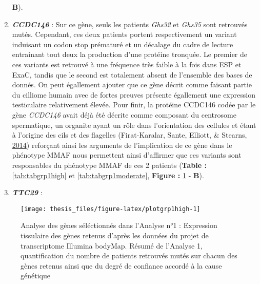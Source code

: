 \documentclass[12pt,twoside]{reedthesis}
\theoremstyle{definition}
\theoremstyle{definition}
\theoremstyle{remark}
\begin{document}
\begin{enumerate}
    \textbf{B}).
  \item
    \textbf{\emph{CCDC146}} : Sur ce gène, seuls les patients \emph{Ghs32}
    et \emph{Ghs35} sont retrouvés mutés. Cependant, ces deux patients
    portent respectivement un variant induisant un codon stop prématuré et
    un décalage du cadre de lecture entrainant tout deux la production
    d'une protéine tronquée. Le premier de ces variants est retrouvé à une
    fréquence très faible à la fois dans ESP et ExaC, tandis que le second
    est totalement absent de l'ensemble des bases de donnés. On peut
    égallement ajouter que ce gène décrit comme faisant partie du cilliome
    humain avec de fortes preuves présente égallement une expression
    testiculaire relativement élevée. Pour finir, la protéine CCDC146
    codée par le gène \emph{CCDC146} avait déjà été décrite comme
    composant du centrosome spermatique, un organite ayant un rôle dans
    l'orientation des cellules et étant à l'origine des cils et des
    flagelles (Firat-Karalar, Sante, Elliott, \& Stearns,
    \protect\hyperlink{ref-Firat-Karalar2014}{2014}) reforçant ainsi les
    arguments de l'implication de ce gène dans le phénotype MMAF nous
    permettent ainsi d'affirmer que ces variants sont responsables du
    phénotype MMAF de ces 2 patients (\textbf{Table :
    }\ref{tab:tabgrp1high} et \ref{tab:tabgrp1moderate}, \textbf{Figure :
    }\ref{fig:plotgrp1high} - \textbf{B}).
  \item
    \textbf{\emph{TTC29}} :
  \end{enumerate}
  
  \begin{figure}
  
  {\centering \texttt{[image: thesis\_files/figure-latex/plotgrp1high-1]} 
  
  }
  
  \caption[Analyse des gènes séléctionnés dans l'Analyse n°1]{Analyse des gènes séléctionnés dans l'Analyse n°1 : Expression tissulaire des gènes retenus d'après les données du projet de transcriptome Illumina bodyMap. Résumé de l'Analyse 1, quantification du nombre de patients retrouvés mutés sur chacun des gènes retenus ainsi que du degré de confiance accordé à la cause génétique}\label{fig:plotgrp1high}
  \end{figure}
  
\end{document}
